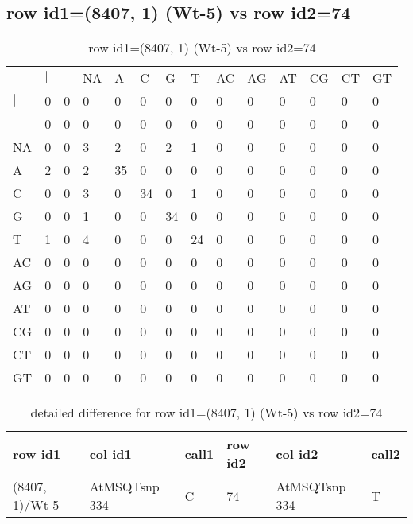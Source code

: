 \subsection{row id1=(8407, 1) (Wt-5) vs row id2=74}
\begin{center}
\begin{longtable}{|l|l|l|l|l|l|l|l|l|l|l|l|l|l|}
\caption{row id1=(8407, 1) (Wt-5) vs row id2=74} \label{table_dm474}\\
\hline
\\
\hline
&$|$&-&NA&A&C&G&T&AC&AG&AT&CG&CT&GT\\
$|$&0&0&0&0&0&0&0&0&0&0&0&0&0\\
-&0&0&0&0&0&0&0&0&0&0&0&0&0\\
NA&0&0&3&2&0&2&1&0&0&0&0&0&0\\
A&2&0&2&35&0&0&0&0&0&0&0&0&0\\
C&0&0&3&0&34&0&1&0&0&0&0&0&0\\
G&0&0&1&0&0&34&0&0&0&0&0&0&0\\
T&1&0&4&0&0&0&24&0&0&0&0&0&0\\
AC&0&0&0&0&0&0&0&0&0&0&0&0&0\\
AG&0&0&0&0&0&0&0&0&0&0&0&0&0\\
AT&0&0&0&0&0&0&0&0&0&0&0&0&0\\
CG&0&0&0&0&0&0&0&0&0&0&0&0&0\\
CT&0&0&0&0&0&0&0&0&0&0&0&0&0\\
GT&0&0&0&0&0&0&0&0&0&0&0&0&0\\
\hline
\end{longtable}
\end{center}

\begin{center}
\begin{longtable}{|l|l|l|l|l|l|}
\caption{detailed difference for row id1=(8407, 1) (Wt-5) vs row id2=74} \label{table_dm475}\\
\hline
row id1&col id1&call1&row id2&col id2&call2\\
\hline
(8407, 1)/Wt-5&AtMSQTsnp 334&C&74&AtMSQTsnp 334&T\\
\hline
\end{longtable}
\end{center}

